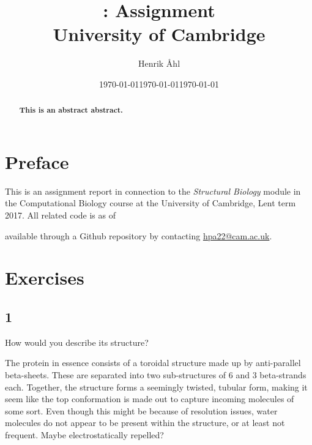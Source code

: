 \documentclass[10pt]{article}\usepackage[]{graphicx}\usepackage[]{color}
\title{
  \bf \course: Assignment \ass \\[1em]
  \small{University of Cambridge}
}
\author{Henrik Åhl}
\date{\today}
\theoremstyle{plain}
\newcommand{\course}{Structural Biology}
\newcommand{\term}{Lent term 2017}
\begin{document}
\date{\today}
\maketitle
\setcounter{page}{1}


\maketitle
\begin{abstract}
	{\bf 
		This is an abstract abstract.
	}
\end{abstract}

\begin{multicols*}{2}
	\section*{Preface}
	This is an assignment report in connection to the \textit{\course}
	module in the Computational Biology course at the University of Cambridge,
	\term. All related code is as of \date{\today} available through a
	Github repository by contacting \href{mailto:hpa22@cam.ac.uk}{hpa22@cam.ac.uk}.
	
	\section*{Exercises}
	\subsection*{1}
	How would you describe its structure? 
	
	The protein in essence consists of a toroidal structure made up by anti-parallel
	beta-sheets. These are separated into two sub-structures of 6 and 3 beta-strands
	each. Together, the structure forms a seemingly twisted, tubular form, making it
	seem like the top conformation is made out to capture incoming molecules of some
	sort. Even though this might be because of resolution issues, water molecules do
	not appear to be present within the structure, or at least not frequent. Maybe
	electrostatically repelled? 
	
	

\end{multicols*}
\end{document}
